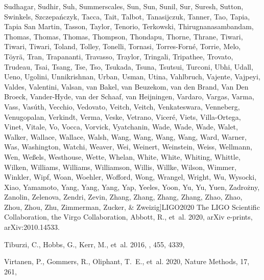 \documentclass[times,tight]{aastex631}
\begin{document}
\begin{thebibliography}{}
{  {Sudhagar}, {Sudhir}, {Suh}, {Summerscales}, {Sun}, {Sun}, {Sunil}, {Sur},
  {Suresh}, {Sutton}, {Swinkels}, {Szczepa{\'n}czyk}, {Tacca}, {Tait},
  {Talbot}, {Tanasijczuk}, {Tanner}, {Tao}, {Tapia}, {Tapia San Martin},
  {Tasson}, {Taylor}, {Tenorio}, {Terkowski}, {Thirugnanasambandam}, {Thomas},
  {Thomas}, {Thomas}, {Thompson}, {Thondapu}, {Thorne}, {Thrane}, {Tiwari},
  {Tiwari}, {Tiwari}, {Toland}, {Tolley}, {Tonelli}, {Tornasi},
  {Torres-Forn{\'e}}, {Torrie}, {Melo}, {T{\"o}yr{\"a}}, {Tran}, {Trapananti},
  {Travasso}, {Traylor}, {Tringali}, {Tripathee}, {Trovato}, {Trudeau}, {Tsai},
  {Tsang}, {Tse}, {Tso}, {Tsukada}, {Tsuna}, {Tsutsui}, {Turconi}, {Ubhi},
  {Udall}, {Ueno}, {Ugolini}, {Unnikrishnan}, {Urban}, {Usman}, {Utina},
  {Vahlbruch}, {Vajente}, {Vajpeyi}, {Valdes}, {Valentini}, {Valsan}, {van
  Bakel}, {van Beuzekom}, {van den Brand}, {Van Den Broeck}, {Vander-Hyde},
  {van der Schaaf}, {van Heijningen}, {Vardaro}, {Vargas}, {Varma}, {Vass},
  {Vas{\'u}th}, {Vecchio}, {Vedovato}, {Veitch}, {Veitch}, {Venkateswara},
  {Venneberg}, {Venugopalan}, {Verkindt}, {Verma}, {Veske}, {Vetrano},
  {Vicer{\'e}}, {Viets}, {Villa-Ortega}, {Vinet}, {Vitale}, {Vo}, {Vocca},
  {Vorvick}, {Vyatchanin}, {Wade}, {Wade}, {Wade}, {Walet}, {Walker},
  {Wallace}, {Wallace}, {Walsh}, {Wang}, {Wang}, {Wang}, {Wang}, {Ward},
  {Warner}, {Was}, {Washington}, {Watchi}, {Weaver}, {Wei}, {Weinert},
  {Weinstein}, {Weiss}, {Wellmann}, {Wen}, {We{\ss}els}, {Westhouse}, {Wette},
  {Whelan}, {White}, {White}, {Whiting}, {Whittle}, {Wilken}, {Williams},
  {Williams}, {Williamson}, {Willis}, {Willke}, {Wilson}, {Wimmer}, {Winkler},
  {Wipf}, {Woan}, {Woehler}, {Wofford}, {Wong}, {Wrangel}, {Wright}, {Wu},
  {Wysocki}, {Xiao}, {Yamamoto}, {Yang}, {Yang}, {Yang}, {Yap}, {Yeeles},
  {Yoon}, {Yu}, {Yu}, {Yuen}, {Zadro{\.z}ny}, {Zanolin}, {Zelenova}, {Zendri},
  {Zevin}, {Zhang}, {Zhang}, {Zhang}, {Zhang}, {Zhao}, {Zhao}, {Zhou}, {Zhou},
  {Zhu}, {Zimmerman}, {Zucker}, \& {Zweizig}}]{LIGO2020}
{The LIGO Scientific Collaboration}, {the Virgo Collaboration}, {Abbott}, R.,
  {et~al.} 2020, arXiv e-prints, arXiv:2010.14533.
\newblock {}

{Tiburzi}, C., {Hobbs}, G., {Kerr}, M., {et~al.} 2016, \mnras, 455, 4339,

Virtanen, P., Gommers, R., Oliphant, T.~E., {et~al.} 2020, Nature Methods, 17,
  261, 


\end{thebibliography}
\end{document}
